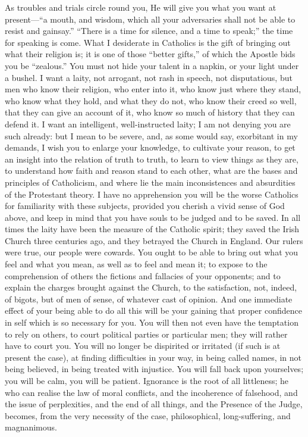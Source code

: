 As troubles and trials circle round you, He will give
you what you want at present—``a mouth, and
wisdom, which all your adversaries shall not be able to
resist and gainsay.'' ``There is a time for
silence, and a time to speak;'' the time for speaking
is come. What I desiderate in Catholics is the gift of
bringing out what their religion is; it is one of those
``better gifts,'' of which the Apostle bids you
be ``zealous.'' You must not hide your talent in
a napkin, or your light under a bushel. I want a laity,
not arrogant, not rash in speech, not disputatious, but
men who know their religion, who enter into it, who know
just where they stand, who know what they hold, and what
they do not, who know their creed so well, that they can
give an account of it, who know so much of history that
they can defend it. I want an intelligent,
well-instructed laity; I am not denying you are such
already: but I mean to be severe, and, as some would say,
exorbitant in my demands, I wish you to enlarge your
knowledge, to cultivate your reason, to get an insight
into the relation of truth to truth, to learn to view
things as they are, to understand how faith and reason
stand to each other, what are the bases and principles of
Catholicism, and where lie the main inconsistences and
absurdities of the Protestant theory. I have no
apprehension you will be the worse Catholics for
familiarity with these subjects, provided you cherish a
vivid sense of God above, and keep in mind that you have
souls to be judged and to be saved. In all times the
laity have been the measure of the Catholic spirit; they
saved the Irish Church three centuries ago, and they
betrayed the Church in England. Our rulers were true, our
people were cowards. You ought to be able to bring out
what you feel and what you mean, as well as to feel and
mean it; to expose to the comprehension of others the
fictions and fallacies of your opponents; and to explain
the charges brought against the Church, to the
satisfaction, not, indeed, of bigots, but of men of
sense, of whatever cast of opinion. And one immediate
effect of your being able to do all this will be your
gaining that proper confidence in self which is so
necessary for you. You will then not even have the
temptation to rely on others, to court political parties
or particular men; they will rather have to court you.
You will no longer be dispirited or irritated (if such is
at present the case), at finding difficulties in your
way, in being called names, in not being believed, in
being treated with injustice. You will fall back upon
yourselves; you will be calm, you will be patient.
Ignorance is the root of all littleness; he who can
realise the law of moral conflicts, and the incoherence
of falsehood, and the issue of perplexities, and the end
of all things, and the Presence of the Judge, becomes,
from the very necessity of the case, philosophical,
long-suffering, and magnanimous.

